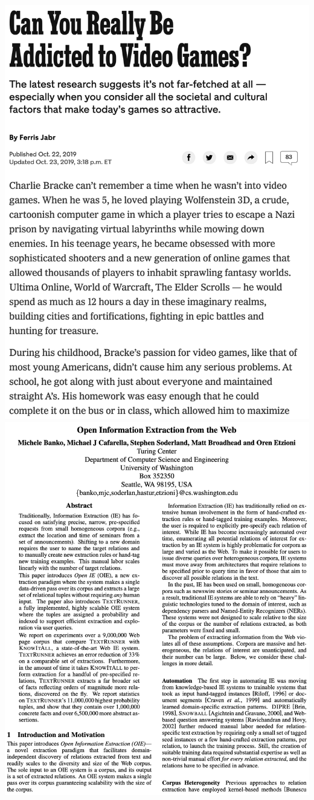 \documentclass[landscape]{jhuslides3C}
\begin{document}
\includegraphics[scale=0.35]{nytimes-article.png}
\includegraphics[scale=0.35]{research-paper-ie.png}
\end{document}
